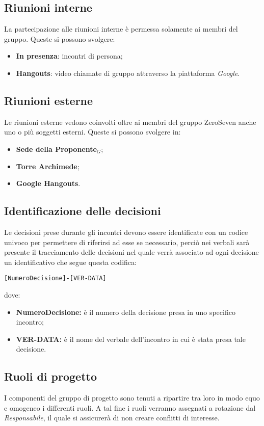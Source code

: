 \subsection{Riunioni interne}
La partecipazione alle riunioni interne è permessa solamente ai membri del gruppo. Queste si possono svolgere:
\begin{itemize}
	\item \textbf{In presenza}: incontri di persona;
	\item \textbf{Hangouts}: video chiamate di gruppo attraverso la piattaforma \textit{Google}.
\end{itemize}
\subsection{Riunioni esterne}
Le riunioni esterne vedono coinvolti oltre ai membri del gruppo ZeroSeven anche uno o più soggetti esterni. Queste si possono svolgere  in:
\begin{itemize}
	\item \textbf{Sede della Proponente$_{G}$};
	\item \textbf{Torre Archimede};
	\item \textbf{Google Hangouts}.
\end{itemize}
\subsection{Identificazione delle decisioni}
Le decisioni prese durante gli incontri devono essere identificate con un codice univoco per permettere di riferirsi ad esse se necessario, perciò nei verbali sarà presente il tracciamento delle decisioni nel quale verrà associato ad ogni decisione un identificativo che segue questa codifica:
\begin{center}
	\texttt{[NumeroDecisione]-[VER-DATA]}
\end{center}
dove:
\begin{itemize}
	\item \textbf{NumeroDecisione:} è il numero della decisione presa in uno specifico incontro;
	\item \textbf{VER-DATA:} è il nome del verbale dell'incontro in cui è stata presa tale decisione.
\end{itemize}



\subsection{Ruoli di progetto}
I componenti del gruppo di progetto sono tenuti a ripartire tra loro in modo equo e omogeneo i differenti ruoli. A tal fine i ruoli verranno assegnati a rotazione dal \textit{Responsabile}, il quale si assicurerà di non creare conflitti di interesse.
